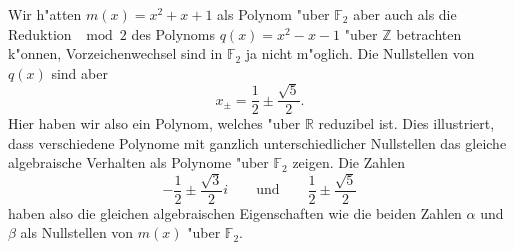 \begin{beispiel}
Wir h"atten $m(x)=x^2+x+1$ als Polynom "uber $\mathbb F_2$ aber auch
als die Reduktion $\mod 2$ des Polynoms $q(x)=x^2-x-1$ "uber $\mathbb Z$
betrachten k"onnen, Vorzeichenwechsel sind in $\mathbb F_2$ ja nicht
m"oglich.
Die Nullstellen von $q(x)$ sind aber
\[
x_{\pm}
=
\frac12\pm\frac{\sqrt{5}}2.
\]
Hier haben wir also ein Polynom, welches "uber $\mathbb R$ reduzibel ist.
Dies illustriert, dass verschiedene Polynome mit ganzlich unterschiedlicher
Nullstellen das gleiche algebraische Verhalten als Polynome "uber $\mathbb F_2$
zeigen.
Die Zahlen
\[
-\frac12\pm\frac{\sqrt{3}}{2}i
\qquad\text{und}\qquad
\frac12\pm\frac{\sqrt{5}}{2}
\]
haben also die gleichen algebraischen Eigenschaften wie die beiden Zahlen
$\alpha$ und $\beta$ als Nullstellen von $m(x)$ "uber $\mathbb F_2$.
\end{beispiel}


